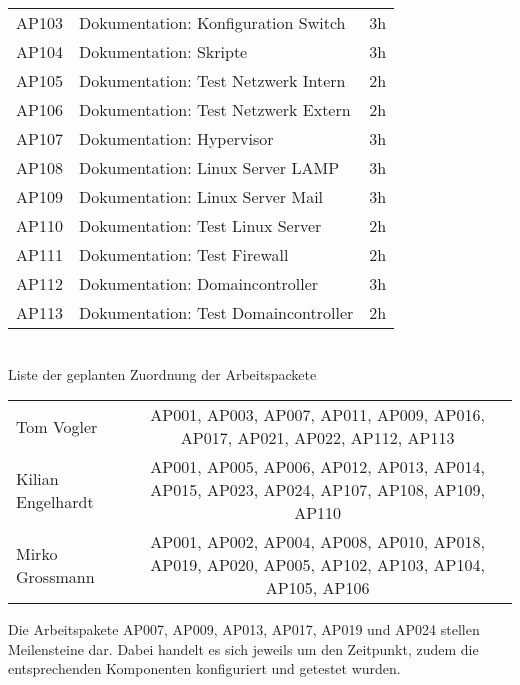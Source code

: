 \begin{tabular}{|l|l|l|}
AP103 & Dokumentation: Konfiguration Switch & 3h\\
AP104 & Dokumentation: Skripte & 3h\\
AP105 & Dokumentation: Test Netzwerk Intern & 2h\\
AP106 & Dokumentation: Test Netzwerk Extern & 2h\\
AP107 & Dokumentation: Hypervisor & 3h\\
AP108 & Dokumentation: Linux Server LAMP & 3h\\
AP109 & Dokumentation: Linux Server Mail & 3h\\
AP110 & Dokumentation: Test Linux Server & 2h\\
AP111 & Dokumentation: Test Firewall & 2h\\
AP112 & Dokumentation: Domaincontroller & 3h\\
AP113 & Dokumentation: Test Domaincontroller & 2h\\

\hline
\end{tabular}
\vspace{0.5cm}\\
Liste der geplanten Zuordnung der Arbeitspackete\\
\noindent \begin{tabular}{|l|c|}
\hline
Tom Vogler & AP001, AP003, AP007, AP011, AP009, AP016, AP017, AP021, AP022, AP112, AP113 \\
Kilian Engelhardt & AP001, AP005, AP006, AP012, AP013, AP014, AP015, AP023, AP024, AP107, AP108, AP109, AP110 \\
Mirko Grossmann & AP001, AP002, AP004, AP008, AP010, AP018, AP019, AP020, AP005, AP102, AP103, AP104, AP105, AP106 \\
\hline
\end{tabular}

Die Arbeitspakete AP007, AP009, AP013, AP017, AP019 und AP024 stellen Meilensteine dar. Dabei handelt es sich jeweils um den Zeitpunkt, zudem die entsprechenden Komponenten konfiguriert und getestet wurden.

 
